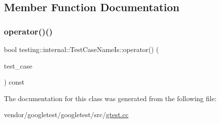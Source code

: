 \subsection{Member Function Documentation}
\mbox{\label{classtesting_1_1internal_1_1_test_case_name_is_aa96c4e9facbaa7043c8f0b34465d1eae}} 
\subsubsection{\texorpdfstring{operator()()}{operator()()}}
{\footnotesize\ttfamily bool testing\+::internal\+::\+Test\+Case\+Name\+Is\+::operator() (\begin{DoxyParamCaption}\item[{const \hyperlink{classtesting_1_1_test_case}{Test\+Case} $\ast$}]{test\+\_\+case }\end{DoxyParamCaption}) const\hspace{0.3cm}{\ttfamily [inline]}}



The documentation for this class was generated from the following file\+:\begin{DoxyCompactItemize}
\item 
vendor/googletest/googletest/src/\hyperlink{gtest_8cc}{gtest.\+cc}\end{DoxyCompactItemize}
